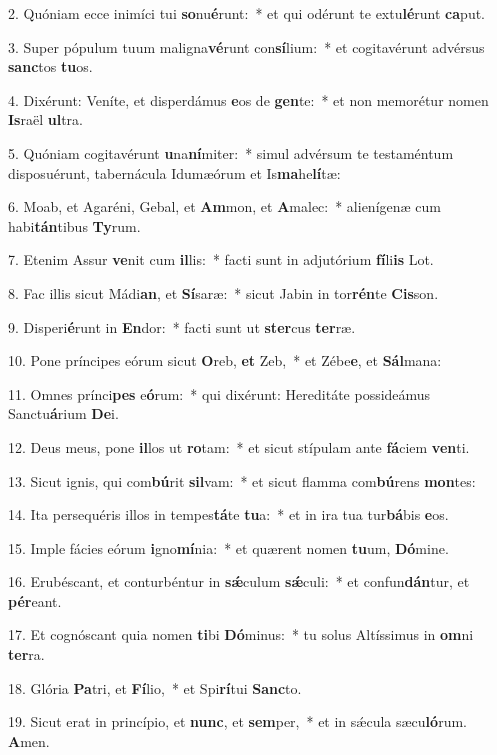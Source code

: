 2. Quóniam ecce inimíci tui \textbf{so}nu\textbf{é}runt:~*  et qui odérunt te extu\textbf{lé}runt \textbf{ca}put.\

3. Super pópulum tuum maligna\textbf{vé}runt con\textbf{sí}lium:~*  et cogitavérunt advérsus \textbf{sanc}tos \textbf{tu}os.\

4. Dixérunt: Veníte, et disperdámus \textbf{e}os de \textbf{gen}te:~*  et non memorétur nomen \textbf{Is}raël \textbf{ul}tra.\

5. Quóniam cogitavérunt \textbf{u}na\textbf{ní}miter:~*  simul advérsum te testaméntum disposuérunt, tabernácula Idumæórum et Is\textbf{ma}he\textbf{lí}tæ:\

6. Moab, et Agaréni, Gebal, et \textbf{Am}mon, et \textbf{A}malec:~*  alienígenæ cum habi\textbf{tán}tibus \textbf{Ty}rum.\

7. Etenim Assur \textbf{ve}nit cum \textbf{il}lis:~*  facti sunt in adjutórium \textbf{fí}li\textbf{is} Lot.\

8. Fac illis sicut Mádi\textbf{an}, et \textbf{Sí}saræ:~*  sicut Jabin in tor\textbf{rén}te \textbf{Cis}son.\

9. Disperi\textbf{é}runt in \textbf{En}dor:~*  facti sunt ut \textbf{ster}cus \textbf{ter}ræ.\

10. Pone príncipes eórum sicut \textbf{O}reb, \textbf{et} Zeb,~*  et Zébe\textbf{e}, et \textbf{Sál}mana:\

11. Omnes prínci\textbf{pes} e\textbf{ó}rum:~*  qui dixérunt: Hereditáte possideámus Sanctu\textbf{á}rium \textbf{De}i.\

12. Deus meus, pone \textbf{il}los ut \textbf{ro}tam:~*  et sicut stípulam ante \textbf{fá}ciem \textbf{ven}ti.\

13. Sicut ignis, qui com\textbf{bú}rit \textbf{sil}vam:~*  et sicut flamma com\textbf{bú}rens \textbf{mon}tes:\

14. Ita persequéris illos in tempes\textbf{tá}te \textbf{tu}a:~*  et in ira tua tur\textbf{bá}bis \textbf{e}os.\

15. Imple fácies eórum \textbf{i}gno\textbf{mí}nia:~*  et quærent nomen \textbf{tu}um, \textbf{Dó}mine.\

16. Erubéscant, et conturbéntur in \textbf{sǽ}culum \textbf{sǽ}culi:~*  et confun\textbf{dán}tur, et \textbf{pér}eant.\

17. Et cognóscant quia nomen \textbf{ti}bi \textbf{Dó}minus:~*  tu solus Altíssimus in \textbf{om}ni \textbf{ter}ra.\

18. Glória \textbf{Pa}tri, et \textbf{Fí}lio,~*  et Spi\textbf{rí}tui \textbf{Sanc}to.\

19. Sicut erat in princípio, et \textbf{nunc}, et \textbf{sem}per,~*  et in sǽcula sæcu\textbf{ló}rum. \textbf{A}men.\

